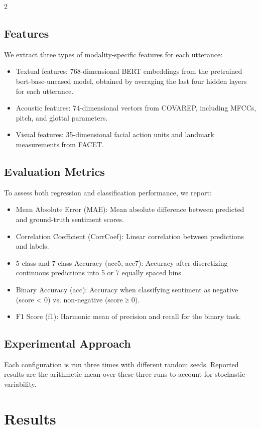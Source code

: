 \documentclass[10pt]{article}
\begin{document}
\begin{multicols}{2}
\subsection{Features}
\par We extract three types of modality-specific features for each utterance:
\begin{itemize}
    \item Textual features: 768-dimensional BERT embeddings from the pretrained bert-base-uncased model, obtained by averaging the last four hidden layers for each utterance.
    \item Acoustic features: 74-dimensional vectors from COVAREP, including MFCCs, pitch, and glottal parameters.
    \item Visual features: 35-dimensional facial action units and landmark measurements from FACET.
\end{itemize}

\subsection{Evaluation Metrics}
To assess both regression and classification performance, we report:
\begin{itemize}
    \item Mean Absolute Error (MAE): Mean absolute difference between predicted and ground-truth sentiment scores.
    \item Correlation Coefficient (CorrCoef): Linear correlation between predictions and labels.
    \item 5-class and 7-class Accuracy (acc5, acc7): Accuracy after discretizing continuous predictions into 5 or 7 equally spaced bins.
    \item Binary Accuracy (acc): Accuracy when classifying sentiment as negative (score < 0) vs. non-negative (score ≥ 0).
    \item F1 Score (f1): Harmonic mean of precision and recall for the binary task.
\end{itemize}

\subsection{Experimental Approach}
\par Each configuration is run three times with different random seeds. Reported results are the arithmetic mean over these three runs to account for stochastic variability.

\section{Results}

\end{multicols}
\end{document}

